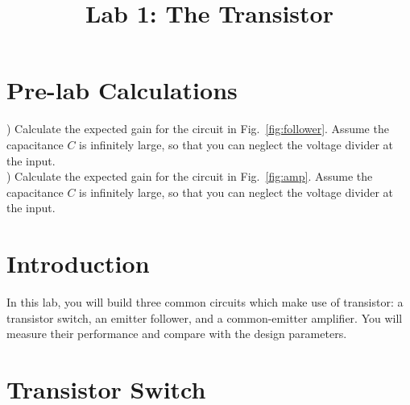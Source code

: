 \documentclass[12pt]{article}
\begin{document}

\title{Lab 1:  The Transistor}

\maketitle

\section{Pre-lab Calculations}
) Calculate the expected gain for the circuit in Fig.~\ref{fig:follower}.   Assume the capacitance $C$ is infinitely large, so that you can neglect the voltage divider at the input.\\

) Calculate the expected gain for the circuit in Fig.~\ref{fig:amp}.  Assume the capacitance $C$ is infinitely large, so that you can neglect the voltage divider at the input.

\section{Introduction}

In this lab, you will build three common circuits which make use of transistor:  a transistor switch, an emitter follower, and a common-emitter amplifier.  You will measure their performance and compare with the design parameters.

\section{Transistor Switch}
\end{document}
